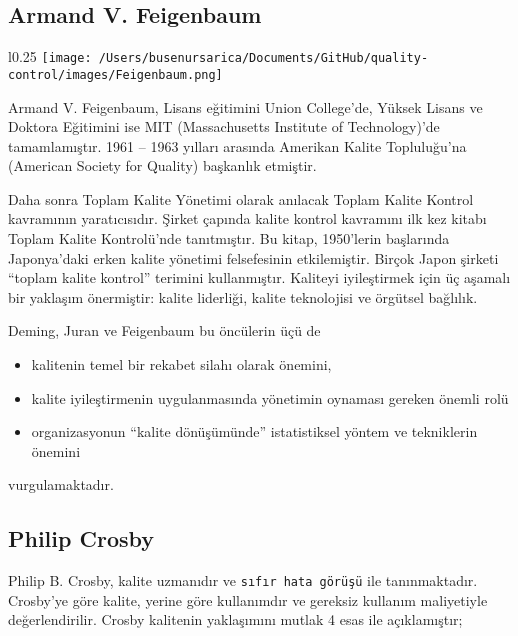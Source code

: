\documentclass[
]{book}
\providecommand{\tightlist}{%
  \setlength{\itemsep}{0pt}\setlength{\parskip}{0pt}}
\begin{document}
\hypertarget{armand-v.-feigenbaum}{%
\subsection{Armand V. Feigenbaum}\label{armand-v.-feigenbaum}}

\begin{wrapfigure}{l}{0.25\textwidth}
\texttt{[image: /Users/busenursarica/Documents/GitHub/quality-control/images/Feigenbaum.png]}
\end{wrapfigure}

Armand V. Feigenbaum, Lisans eğitimini Union College'de, Yüksek Lisans ve Doktora Eğitimini ise MIT (Massachusetts Institute of Technology)'de tamamlamıştır. 1961 -- 1963 yılları arasında Amerikan Kalite Topluluğu'na (American Society for Quality) başkanlık etmiştir.

Daha sonra Toplam Kalite Yönetimi olarak anılacak Toplam Kalite Kontrol kavramının yaratıcısıdır. Şirket çapında kalite kontrol kavramını ilk kez kitabı Toplam Kalite Kontrolü'nde tanıtmıştır. Bu kitap, 1950'lerin başlarında Japonya'daki erken kalite yönetimi felsefesinin etkilemiştir. Birçok Japon şirketi ``toplam kalite kontrol'' terimini kullanmıştır. Kaliteyi iyileştirmek için üç aşamalı bir yaklaşım önermiştir: kalite liderliği, kalite teknolojisi ve örgütsel bağlılık.


Deming, Juran ve Feigenbaum bu öncülerin üçü de

\begin{itemize}
\tightlist
\item
  kalitenin temel bir rekabet silahı olarak önemini,
\item
  kalite iyileştirmenin uygulanmasında yönetimin oynaması gereken önemli rolü
\item
  organizasyonun ``kalite dönüşümünde'' istatistiksel yöntem ve tekniklerin önemini
\end{itemize}

vurgulamaktadır.


\hypertarget{philip-crosby}{%
\subsection{Philip Crosby}\label{philip-crosby}}

Philip B. Crosby, kalite uzmanıdır ve \texttt{sıfır\ hata\ görüşü} ile tanınmaktadır. Crosby'ye göre kalite, yerine göre kullanımdır ve gereksiz kullanım maliyetiyle değerlendirilir. Crosby kalitenin yaklaşımını mutlak 4 esas ile açıklamıştır;
\end{document}
